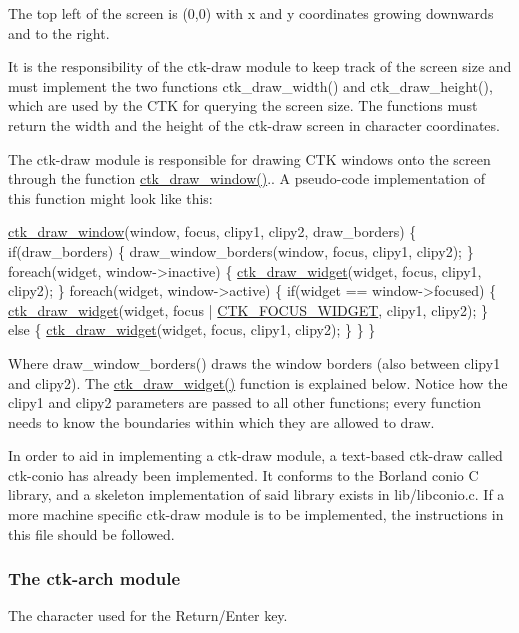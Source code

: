 The top left of the screen is (0,0) with x and y coordinates growing downwards and to the right.

It is the responsibility of the ctk-\/draw module to keep track of the screen size and must implement the two functions ctk\+\_\+draw\+\_\+width() and ctk\+\_\+draw\+\_\+height(), which are used by the C\+T\+K for querying the screen size. The functions must return the width and the height of the ctk-\/draw screen in character coordinates.

The ctk-\/draw module is responsible for drawing C\+T\+K windows onto the screen through the function \hyperlink{group__ctkdraw_gae172d39b14556ee88707d4e6979abb34}{ctk\+\_\+draw\+\_\+window()}.. A pseudo-\/code implementation of this function might look like this\+: 
\begin{DoxyCode}
\hyperlink{group__ctkdraw_gae172d39b14556ee88707d4e6979abb34}{ctk\_draw\_window}(window, focus, clipy1, clipy2, draw\_borders) \{
   \textcolor{keywordflow}{if}(draw\_borders) \{
      draw\_window\_borders(window, focus, clipy1, clipy2);
   \}
   \textcolor{keywordflow}{foreach}(widget, window->inactive) \{
      \hyperlink{group__ctkdraw_ga2c09354ec5cfdb654b09cf478e8f2399}{ctk\_draw\_widget}(widget, focus, clipy1, clipy2);
   \}
   \textcolor{keywordflow}{foreach}(widget, window->active) \{
      \textcolor{keywordflow}{if}(widget == window->focused) \{
     \hyperlink{group__ctkdraw_ga2c09354ec5cfdb654b09cf478e8f2399}{ctk\_draw\_widget}(widget, focus | \hyperlink{group__ctkdraw_gafa49312af6ac5411ecbc0c11caa6fcf2}{CTK\_FOCUS\_WIDGET},
                     clipy1, clipy2);
  \} \textcolor{keywordflow}{else} \{
     \hyperlink{group__ctkdraw_ga2c09354ec5cfdb654b09cf478e8f2399}{ctk\_draw\_widget}(widget, focus, clipy1, clipy2);
  \}
   \}
\}
\end{DoxyCode}


Where draw\+\_\+window\+\_\+borders() draws the window borders (also between clipy1 and clipy2). The \hyperlink{group__ctkdraw_ga2c09354ec5cfdb654b09cf478e8f2399}{ctk\+\_\+draw\+\_\+widget()} function is explained below. Notice how the clipy1 and clipy2 parameters are passed to all other functions; every function needs to know the boundaries within which they are allowed to draw.

In order to aid in implementing a ctk-\/draw module, a text-\/based ctk-\/draw called ctk-\/conio has already been implemented. It conforms to the Borland conio C library, and a skeleton implementation of said library exists in lib/libconio.\+c. If a more machine specific ctk-\/draw module is to be implemented, the instructions in this file should be followed. \hypertarget{ctk-arch}{}\subsubsection{The ctk-\/arch module}\label{ctk-arch}
The character used for the Return/\+Enter key.

